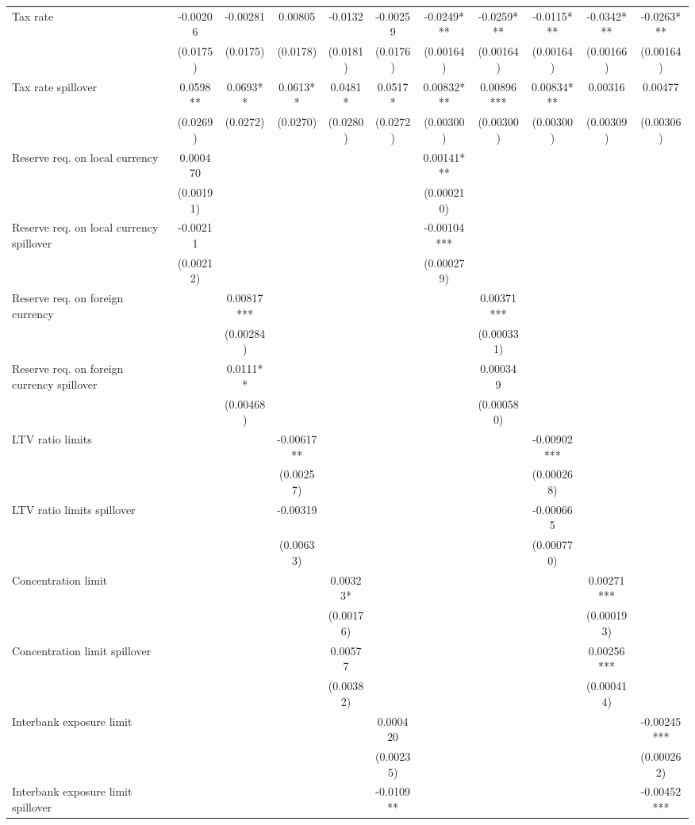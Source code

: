 \begin{tabular}{lcccccccccc}
Tax rate & -0.00206 & -0.00281 & 0.00805 & -0.0132 & -0.00259 & -0.0249*** & -0.0259*** & -0.0115*** & -0.0342*** & -0.0263*** \\
 & (0.0175) & (0.0175) & (0.0178) & (0.0181) & (0.0176) & (0.00164) & (0.00164) & (0.00164) & (0.00166) & (0.00164) \\
Tax rate spillover & 0.0598** & 0.0693** & 0.0613** & 0.0481* & 0.0517* & 0.00832*** & 0.00896*** & 0.00834*** & 0.00316 & 0.00477 \\
 & (0.0269) & (0.0272) & (0.0270) & (0.0280) & (0.0272) & (0.00300) & (0.00300) & (0.00300) & (0.00309) & (0.00306) \\
Reserve req. on local currency & 0.000470 &  &  &  &  & 0.00141*** &  &  &  &  \\
 & (0.00191) &  &  &  &  & (0.000210) &  &  &  &  \\
Reserve req. on local currency spillover & -0.00211 &  &  &  &  & -0.00104*** &  &  &  &  \\
 & (0.00212) &  &  &  &  & (0.000279) &  &  &  &  \\
Reserve req. on foreign currency &  & 0.00817*** &  &  &  &  & 0.00371*** &  &  &  \\
 &  & (0.00284) &  &  &  &  & (0.000331) &  &  &  \\
Reserve req. on foreign currency spillover &  & 0.0111** &  &  &  &  & 0.000349 &  &  &  \\
 &  & (0.00468) &  &  &  &  & (0.000580) &  &  &  \\
LTV ratio limits &  &  & -0.00617** &  &  &  &  & -0.00902*** &  &  \\
 &  &  & (0.00257) &  &  &  &  & (0.000268) &  &  \\
LTV ratio limits spillover &  &  & -0.00319 &  &  &  &  & -0.000665 &  &  \\
 &  &  & (0.00633) &  &  &  &  & (0.000770) &  &  \\
Concentration limit &  &  &  & 0.00323* &  &  &  &  & 0.00271*** &  \\
 &  &  &  & (0.00176) &  &  &  &  & (0.000193) &  \\
Concentration limit spillover &  &  &  & 0.00577 &  &  &  &  & 0.00256*** &  \\
 &  &  &  & (0.00382) &  &  &  &  & (0.000414) &  \\
Interbank exposure limit &  &  &  &  & 0.000420 &  &  &  &  & -0.00245*** \\
 &  &  &  &  & (0.00235) &  &  &  &  & (0.000262) \\
Interbank exposure limit spillover &  &  &  &  & -0.0109** &  &  &  &  & -0.00452*** \\

\end{tabular}
